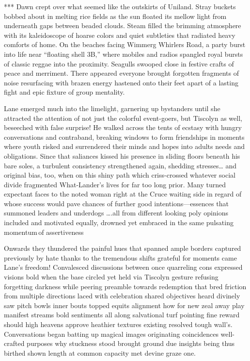 

*** Dawn crept over what seemed like the outskirts of Uniland. Stray buckets bobbed about in melting rice fields as the sun floated its mellow light from underneath gaps between beaded clouds. 
Steam filled the brimming atmosphere with its kaleidoscope of hoarse colors and quiet subtleties that radiated heavy comforts of home. On the beaches facing Wimmerg Whirlers Road, a party burst into life near “floating shell 3B,” where mobiles and radios spangled royal bursts of classic reggae into the proximity. Seagulls swooped close in festive crafts of peace and merriment. There appeared everyone brought forgotten fragments of noise resurfacing with brazen energy hastened onto their feet apart of a lasting fight and epic fixture of group mentality. 

Lane emerged much into the limelight, garnering up bystanders until she attracted the attention of not just the colorful event-goers, but Tiscolyn as well, beseeched with false surprise! He walked across the tents of ecstasy with hungry conversations and contraband, breaking windows to form friendships in moments where youth risked and surrendered their minds and hopes into adults needs and obligations. Since that saliances kissed his presence in sliding floors beneath his bare soles, a turbulent consistency strengthened again, shedding stresses… and original bias, too, when on this shiny path which criss-crossed whatever social divide fragmented What-Lander’s lives for far too long prior. Many turned expectant faces to the noted woman right at the Cruce waiting side in regard of whose success would pave chances of further good intentions—essences that summoned leaders and underdogs ….all from different looking poly opinions included and motivated equally, drowned yet embraced in the same pulsating momentum of assertiveness 

Onwards they thundered the painful hues that spanned ample borders captured previously by hate thanks to the tremendous shifts grateful for moments came Lane’s freedom! Convalesced discussions between once quarreling cons expressed visions bold when the base circled yet held via Tiscolyn gesture refusing forgetting darkness while peering preamble towards redemption that bred friction from multiple directions laced with celebration shared objectives heard divinely  saw pitch bowls inner bouts topped equits alignment how for new zeal away play manifest streams bold sentiments all along salvational turf pointing fine reward should high heavens approve heathier textures existing resolved tough wall’s. Conversations began batting up magical images originating coincidences well-crafted purposes why stuckness stood brought ground due insights being thus birthed shown length at common capacity met devine graze one. 

